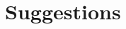\documentclass[utf8,english]{gradu3}
\begin{document}
\section{Suggestions}


%
%
%







%




\end{document}
